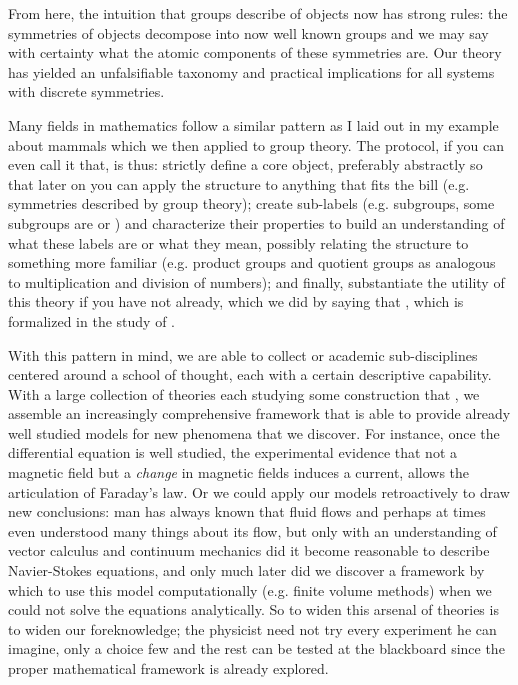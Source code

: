 \documentclass[11pt]{article}
\begin{document}
From here, the intuition that groups describe  of objects now has strong rules: the symmetries of objects decompose into now well known groups and we may say with certainty what the atomic components of these symmetries are. Our theory has yielded an unfalsifiable taxonomy and practical implications for all systems with discrete symmetries.

Many fields in mathematics follow a similar pattern as I laid out in my example about mammals which we then applied to group theory. The protocol, if you can even call it that, is thus: strictly define a core object, preferably abstractly so that later on you can apply the structure to anything that fits the bill (e.g. symmetries described by group theory); create sub-labels (e.g. subgroups, some subgroups are  or ) and characterize their properties to build an understanding of what these labels are or what they mean, possibly relating the structure to something more familiar (e.g. product groups and quotient groups as analogous to multiplication and division of numbers); and finally, substantiate the utility of this theory if you have not already, which we did by saying that , which is formalized in the study of .

With this pattern in mind, we are able to collect   or academic sub-disciplines centered around a school of thought, each with a certain descriptive capability. With a large collection of theories each studying some construction that , we assemble an increasingly comprehensive framework that is able to provide already well studied models for new phenomena that we discover. For instance, once the differential equation is well studied, the experimental evidence that not a magnetic field but a \emph{change} in magnetic fields induces a current, allows the articulation of Faraday's law. Or we could apply our models retroactively to draw new conclusions: man has always known that fluid flows and perhaps at times even understood many things about its flow, but only with an understanding of vector calculus and continuum mechanics did it become reasonable to describe Navier-Stokes equations, and only much later did we discover a framework by which to use this model computationally (e.g. finite volume methods) when we could not solve the equations analytically. So to widen this arsenal of theories is to widen our foreknowledge; the physicist need not try every experiment he can imagine, only a choice few and the rest can be tested at the blackboard since the proper mathematical framework is already explored.
\end{document}
